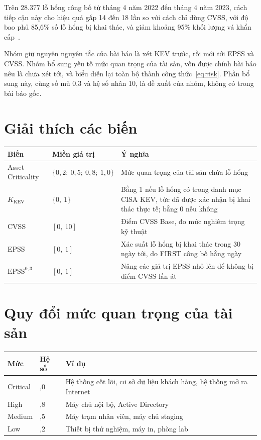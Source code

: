 \documentclass[12pt,a4paper]{article}
\begin{document}
Trên 28.377 lỗ hổng công bố từ tháng 4 năm 2022 đến tháng 4 năm 2023, cách tiếp cận này cho hiệu quả
gấp 14 đến 18 lần so với cách chỉ dùng CVSS, với độ bao phủ 85,6\% số lỗ hổng bị khai thác, và giảm
khoảng 95\% khối lượng vá khẩn cấp~\cite{shimizu2026vmc}.

Nhóm giữ nguyên nguyên tắc của bài báo là xét KEV trước, rồi mới tới EPSS và CVSS. Nhóm bổ sung yếu tố
mức quan trọng của tài sản, vốn được chính bài báo nêu là chưa xét tới, và biểu diễn lại toàn bộ thành
công thức~\eqref{eq:risk}. Phần bổ sung này, cùng số mũ 0,3 và hệ số nhân 10, là đề xuất của nhóm,
không có trong bài báo gốc.

\section{Giải thích các biến}

\begin{center}
\begin{tabular}{>{\raggedright}p{3.4cm} >{\raggedright}p{3.8cm} >{\raggedright\arraybackslash}p{7.4cm}}
\toprule
\textbf{Biến} & \textbf{Miền giá trị} & \textbf{Ý nghĩa} \\
\midrule
Asset Criticality & $\{0{,}2;\ 0{,}5;\ 0{,}8;\ 1{,}0\}$ & Mức quan trọng của tài sản chứa lỗ hổng \\
$K_{\text{KEV}}$ & $\{0,\ 1\}$ & Bằng 1 nếu lỗ hổng có trong danh mục CISA KEV, tức đã được xác nhận bị khai thác thực tế; bằng 0 nếu không \\
CVSS & $[0,\ 10]$ & Điểm CVSS Base, đo mức nghiêm trọng kỹ thuật \\
EPSS & $[0,\ 1]$ & Xác suất lỗ hổng bị khai thác trong 30 ngày tới, do FIRST công bố hằng ngày \\
$\text{EPSS}^{0{,}3}$ & $[0,\ 1]$ & Nâng các giá trị EPSS nhỏ lên để không bị điểm CVSS lấn át \\
\bottomrule
\end{tabular}
\end{center}

\section{Quy đổi mức quan trọng của tài sản}

\begin{center}
\begin{tabular}{>{\raggedright}p{2.6cm} >{\centering}p{2.4cm} >{\raggedright\arraybackslash}p{10cm}}
\toprule
\textbf{Mức} & \textbf{Hệ số} & \textbf{Ví dụ} \\
\midrule
Critical & 1,0 & Hệ thống cốt lõi, cơ sở dữ liệu khách hàng, hệ thống mở ra Internet \\
High & 0,8 & Máy chủ nội bộ, Active Directory \\
Medium & 0,5 & Máy trạm nhân viên, máy chủ staging \\
Low & 0,2 & Thiết bị thử nghiệm, máy in, phòng lab \\
\bottomrule
\end{tabular}
\end{center}
\end{document}
